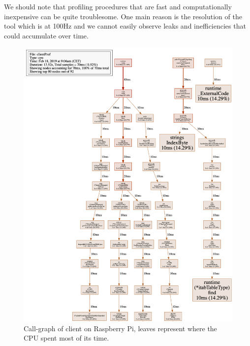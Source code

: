 We should note that profiling procedures that are fast and computationally inexpensive can be quite troublesome. One main reason is the resolution of the tool which is at 100Hz and we cannot easily observe leaks and inefficiencies that could accumulate over time.
\begin{figure}[h]
    \centering
    \includegraphics[width=1\textwidth]{images/6_performance/pi-cpu-call-top.png}
    \caption{Call-graph of client on Raspberry Pi, leaves represent where the CPU spent most of its time.}
    \label{fig:cpu-prof-call}
\end{figure}
